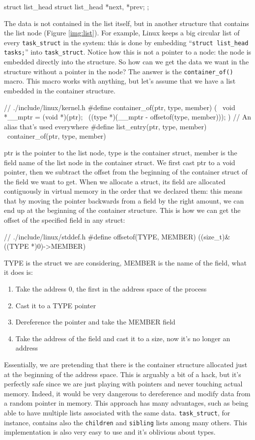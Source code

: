 \begin{code}
struct list_head {
	struct list_head *next, *prev;
};
\end{code}
The data is not contained in the list itself, but in another structure that contains the list node (Figure \ref{img:list}). For example, Linux keeps a big circular list of every \verb|task_struct| in the system: this is done by embedding ``\verb|struct list_head tasks;|'' into \verb|task_struct|. Notice how this is not a pointer to a node: the node is embedded directly into the structure. So how can we get the data we want in the structure without a pointer in the node? The answer is the \verb|container_of()| macro. This macro works with anything, but let's assume that we have a list embedded in the container structure.
\begin{code}
// ./include/linux/kernel.h
#define container_of(ptr, type, member) ({ \
	void *__mptr = (void *)(ptr); \
	((type *)(__mptr - offsetof(type, member))); })
// An alias that's used everywhere
#define list_entry(ptr, type, member) \
        container_of(ptr, type, member)
\end{code}
ptr is the pointer to the list node, type is the container struct, member is the field name of the list node in the container struct. We first cast ptr to a void pointer, then we subtract the offset from the beginning of the container struct of the field we want to get. When we allocate a struct, its field are allocated contiguously in virtual memory in the order that we declared them: this means that by moving the pointer backwards from a field by the right amount, we can end up at the beginning of the container structure. This is how we can get the offset of the specified field in any struct:
\begin{code}
// ./include/linux/stddef.h
#define offsetof(TYPE, MEMBER) ((size_t)&((TYPE *)0)->MEMBER)
\end{code}
TYPE is the struct we are considering, MEMBER is the name of the field, what it does is:
\begin{enumerate}
    \item Take the address 0, the first in the address space of the process
    \item Cast it to a TYPE pointer 
    \item Dereference the pointer and take the MEMBER field
    \item Take the address of the field and cast it to a size, now it's no longer an address
\end{enumerate}
Essentially, we are pretending that there is the container structure allocated just at the beginning of the address space. This is arguably a bit of a hack, but it's perfectly safe since we are just playing with pointers and never touching actual memory. Indeed, it would be very dangerous to dereference and modify data from a random pointer in memory. This approach has many advantages, such as being able to have multiple lists associated with the same data. \verb|task_struct|, for instance, contains also the \verb|children| and \verb|sibling| lists among many others. This implementation is also very easy to use and it's oblivious about types.

